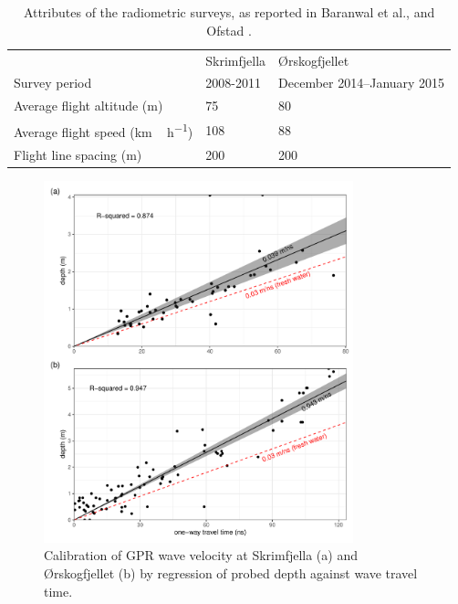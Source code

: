\documentclass[soil, manuscript]{copernicus}
\begin{document}
\newpage
\appendix
\section{}

\appendixtables
\begin{table}[h]
\caption{Attributes of the radiometric surveys, as reported in Baranwal et al., \citeyearpar{baranwalHelicopterborneMagneticElectromagnetic2013} and Ofstad \citeyearpar{ofstadHelicopterborneMagneticRadiometric2015}.}
\begin{tabular}{lll}
\hline
& Skrimfjella & Ørskogfjellet              \\ \cline{2-3} 
Survey period                            & 2008-2011   & December 2014–January 2015 \\
Average flight altitude (m)              & 75          & 80                         \\
Average flight speed (\unit{km\,h^{-1}}) & 108         & 88                         \\
Flight line spacing (m)                  & 200         & 200                        \\ \hline
\end{tabular}
\label{tab:radSurveys}
\end{table}
\clearpage

\appendixfigures
\begin{figure}[ht]
\centering
\includegraphics[width=0.8\textwidth]{figures/GPRwavevelocity.pdf}
\caption{\label{fig:GPRwavevelocity}Calibration of GPR wave velocity at Skrimfjella (a) and Ørskogfjellet (b) by regression of probed depth against wave travel time.}
\end{figure}
\clearpage
\end{document}
